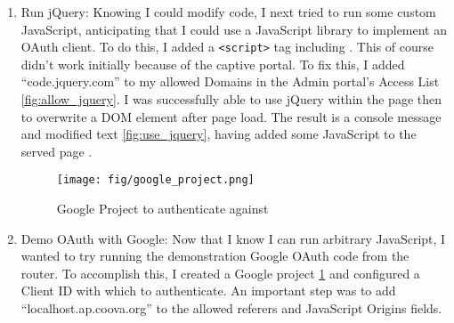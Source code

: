 \begin{enumerate}
\item{Run jQuery:}  Knowing I could modify code, I next tried to run some custom JavaScript,
anticipating that I could use a JavaScript library to implement an OAuth client. To do this, I added
a \texttt{<script>} tag including . This
of course didn't work initially because of the captive portal. To fix this, I added
``code.jquery.com'' to my allowed Domains in the Admin portal's Access List \ref{fig:allow_jquery}.
I was successfully able to use jQuery within the page then to overwrite a DOM element after page
load. The result is a console message and modified text \ref{fig:use_jquery}, having added some
JavaScript to the served page \cite{github:jquery}.

\begin{figure}[ht!]
\centering
\texttt{[image: fig/google\_project.png]}
\caption{Google Project to authenticate against}
\label{fig:google_project}
\end{figure}

\item{Demo OAuth with Google:}  Now that I know I can run arbitrary JavaScript, I wanted to try
running the demonstration Google OAuth code \cite{google:OAuthDemo} from the router. To accomplish
this, I created a Google project \ref{fig:google_project} and configured a Client ID with which to
authenticate. An important step was to add ``localhost.ap.coova.org'' to the allowed referers and
JavaScript Origins fields.

\end{enumerate}
